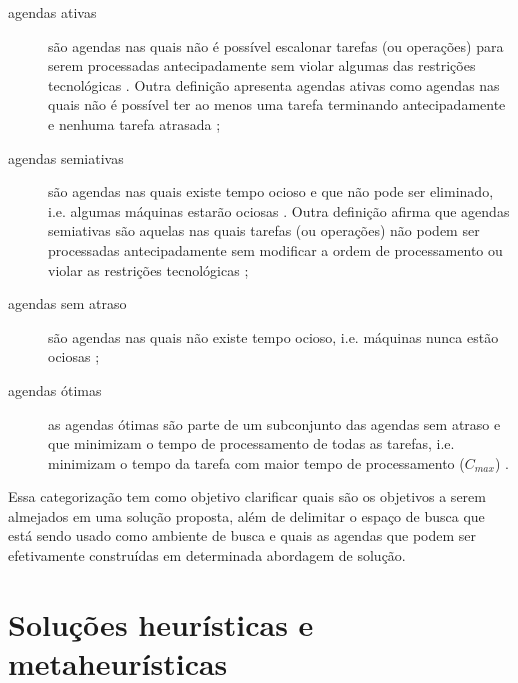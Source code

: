 \documentclass[relatorio,nocolorlinks]{inf-ufg}
\begin{document}
\begin{description}
\item[agendas ativas] s\~{a}o agendas nas quais n\~{a}o \'{e} poss\'{i}vel escalonar tarefas (ou opera\c{c}\~{o}es) para serem processadas
antecipadamente sem violar algumas das restri\c{c}\~{o}es tecnol\'{o}gicas \cite{Brucker2007}. Outra defini\c{c}\~{a}o apresenta agendas ativas como
agendas nas quais n\~{a}o \'{e} poss\'{i}vel ter ao menos uma tarefa terminando antecipadamente e nenhuma tarefa atrasada \cite{Pinedo2008};
\item[agendas semiativas] s\~{a}o agendas nas quais existe tempo ocioso e que n\~{a}o pode ser eliminado, i.e. algumas m\'{a}quinas estar\~{a}o
ociosas \cite{Rondon2009}. Outra defini\c{c}\~{a}o afirma que agendas semiativas s\~{a}o aquelas nas quais tarefas (ou opera\c{c}\~{o}es) n\~{a}o
podem ser processadas antecipadamente sem modificar a ordem de processamento ou violar as restri\c{c}\~{o}es tecnol\'{o}gicas \cite{Brucker2007}
\cite{Pinedo2008};
\item[agendas sem atraso] s\~{a}o agendas nas quais n\~{a}o existe tempo ocioso, i.e. m\'{a}quinas nunca est\~{a}o ociosas \cite{Rondon2009};
\item[agendas \'{o}timas] as agendas \'{o}timas s\~{a}o parte de um subconjunto das agendas sem atraso e que minimizam o tempo de processamento
de todas as tarefas, i.e. minimizam o tempo da tarefa com maior tempo de processamento ($C_{max}$) \cite{Rondon2009}.
\end{description}

Essa categoriza\c{c}\~{a}o tem como objetivo clarificar quais s\~{a}o os objetivos a serem almejados em uma solu\c{c}\~{a}o proposta, al\'{e}m
de delimitar o espa\c{c}o de busca que est\'{a} sendo usado como ambiente de busca e quais as agendas que podem ser efetivamente constru\'{i}das
em determinada abordagem de solu\c{c}\~{a}o.

\chapter{Solu\c{c}\~{o}es heur\'{i}sticas e metaheur\'{i}sticas}
\label{solucoes}
\end{document}
